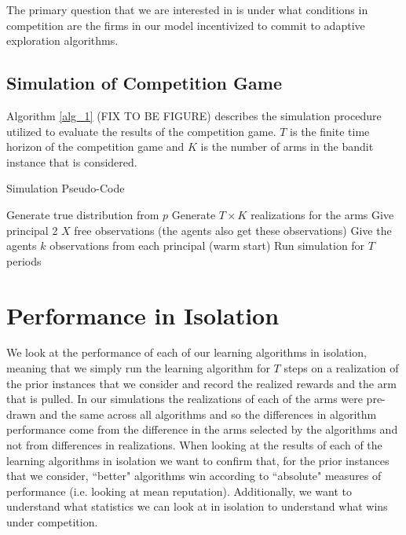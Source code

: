 \documentclass{article}
\theoremstyle{definition}
\begin{document}
The primary question that we are interested in is under what conditions in competition are the firms in our model incentivized to commit to adaptive exploration algorithms.

\subsection{Simulation of Competition Game}
Algorithm \ref{alg_1} (FIX TO BE FIGURE) describes the simulation procedure utilized to evaluate the results of the competition game. $T$ is the finite time horizon of the competition game and $K$ is the number of arms in the bandit instance that is considered.

\begin{algorithm}
\caption{Simulation Pseudo-Code}
\begin{algorithmic}[1]
		\State Generate true distribution from $p$
		\State Generate $T \times K$ realizations for the arms 
				\State Give principal 2 $X$ free observations (the agents also get these observations)
				\State Give the agents $k$ observations from each principal (warm start)
				\State Run simulation for $T$ periods
			\EndFor
		\EndFor
	\EndFor
\EndFor
\end{algorithmic}
\label{alg_1}
\end{algorithm}

\section{Performance in Isolation}
\label{S:5}

We look at the performance of each of our learning algorithms in isolation, meaning that we simply run the learning algorithm for $T$ steps on a realization of the prior instances that we consider and record the realized rewards and the arm that is pulled. In our simulations the realizations of each of the arms were pre-drawn and the same across all algorithms and so the differences in algorithm performance come from the difference in the arms selected by the algorithms and not from differences in realizations. When looking at the results of each of the learning algorithms in isolation we want to confirm that, for the prior instances that we consider, ``better" algorithms win according to ``absolute" measures of performance (i.e. looking at mean reputation). Additionally, we want to understand what statistics we can look at in isolation to understand what wins under competition.
\end{document}
